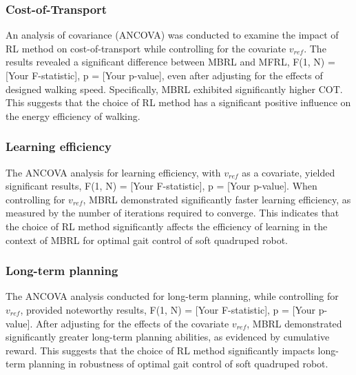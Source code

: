\subsubsection{Cost-of-Transport}
An analysis of covariance (ANCOVA) was conducted to examine the impact of RL method on cost-of-transport while controlling for the covariate $v_{ref}$. The results revealed a significant difference between MBRL and MFRL, F(1, N) = [Your F-statistic], p = [Your p-value], even after adjusting for the effects of designed walking speed. Specifically, MBRL exhibited significantly higher \ac{COT}. This suggests that the choice of RL method has a significant positive influence on the energy efficiency of walking.
\subsubsection{Learning efficiency}
The ANCOVA analysis for learning efficiency, with $v_{ref}$ as a covariate, yielded significant results, F(1, N) = [Your F-statistic], p = [Your p-value]. When controlling for $v_{ref}$, MBRL demonstrated significantly faster learning efficiency, as measured by the number of iterations required to converge. This indicates that the choice of RL method significantly affects the efficiency of learning in the context of MBRL for optimal gait control of soft quadruped robot.
\subsubsection*{Long-term planning}
The ANCOVA analysis conducted for long-term planning, while controlling for $v_{ref}$, provided noteworthy results, F(1, N) = [Your F-statistic], p = [Your p-value]. After adjusting for the effects of the covariate $v_{ref}$, MBRL demonstrated significantly greater long-term planning abilities, as evidenced by cumulative reward. This suggests that the choice of RL method significantly impacts long-term planning in robustness of optimal gait control of soft quadruped robot. 



